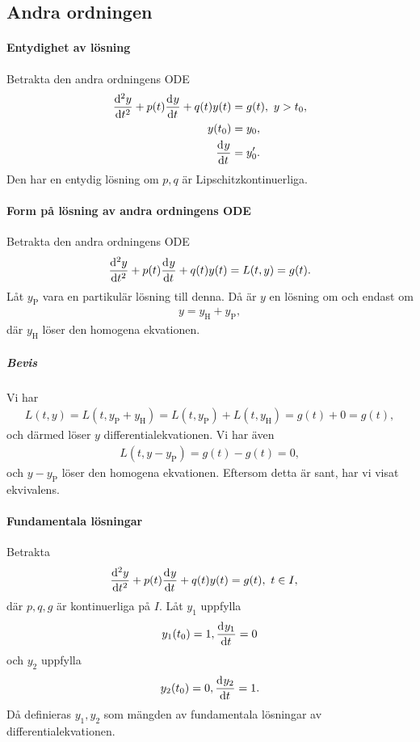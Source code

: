 \subsection{Andra ordningen}

\paragraph{Entydighet av lösning}
Betrakta den andra ordningens ODE
\begin{align*}
	\dv[2]{y}{t} (t) + p(t)\dv[]{y}{t} (t) + q(t)y(t) &= g(t),\ y > t_0, \\
	y(t_0)                                              &= y_0, \\
	\dv[]{y}{t} (t_{0})                                 &= y'_{0}.
\end{align*}
Den har en entydig lösning om $p, q$ är Lipschitzkontinuerliga.

\paragraph{Form på lösning av andra ordningens ODE}
Betrakta den andra ordningens ODE
\begin{align*}
	\dv[2]{y}{t} (t) + p(t)\dv[]{y}{t} (t) + q(t)y(t) = L(t, y) = g(t).
\end{align*}
Låt $y_{\text{P}}$ vara en partikulär lösning till denna. Då är $y$ en lösning om och endast om
\begin{align*}
	y = y_{\text{H}} + y_{\text{P}},
\end{align*}
där $y_{\text{H}}$ löser den homogena ekvationen.

\subparagraph{Bevis}
Vi har
\begin{align*}
	L(t, y) = L(t, y_{\text{P}} + y_{\text{H}}) = L(t, y_{\text{P}}) + L(t, y_{\text{H}}) = g(t) + 0 = g(t),
\end{align*}
och därmed löser $y$ differentialekvationen. Vi har även
\begin{align*}
	L(t, y - y_{\text{P}}) = g(t) - g(t) = 0,
\end{align*}
och $y - y_{\text{P}}$ löser den homogena ekvationen. Eftersom detta är sant, har vi visat ekvivalens.

\paragraph{Fundamentala lösningar}
Betrakta
\begin{align*}
	\deval[2]{y}{t}{t} + p(t)\deval{y}{t}{t} + q(t)y(t) &= g(t),\ t\in I,
\end{align*}
där $p, q, g$ är kontinuerliga på $I$. Låt $y_{1}$ uppfylla
\begin{align*}
	y_{1}(t_0) = 1, \dv[]{y_{1}}{t} (t_0) = 0
\end{align*}
och $y_{2}$ uppfylla
\begin{align*}
	y_{2}(t_0) = 0, \dv[]{y_{2}}{t} (t_0) = 1.
\end{align*}
Då definieras $y_{1}, y_{2}$ som mängden av fundamentala lösningar av differentialekvationen.

